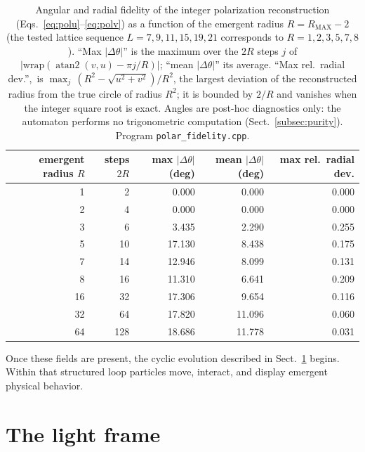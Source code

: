 \documentclass{ijuc}
\renewcommand{\arraystretch}{1.5}
\begin{document}
\begin{table}[htbp]
\centering
\caption{Angular and radial fidelity of the integer polarization reconstruction (Eqs.~\eqref{eq:polu}--\eqref{eq:polv}) as a function of the emergent radius $R=R_{\mathrm{MAX}}-2$ (the tested lattice sequence $L=7,9,11,15,19,21$ corresponds to $R=1,2,3,5,7,8$).  ``Max $|\Delta\theta|$'' is the maximum over the $2R$ steps $j$ of $\lvert\mathrm{wrap}(\operatorname{atan2}(v,u)-\pi j/R)\rvert$; ``mean $|\Delta\theta|$'' its average.  ``Max rel.\ radial dev.'',\ is $\max_{j}\,(R^{2}-\sqrt{u^{2}+v^{2}})/R^{2}$, the largest deviation of the reconstructed radius from the true circle of radius $R^{2}$; it is bounded by $2/R$ and vanishes when the integer square root is exact.  Angles are post-hoc diagnostics only: the automaton performs no trigonometric computation (Sect.~\ref{subsec:purity}).  Program \texttt{polar\_fidelity.cpp}.}
\label{tab:polar-fidelity}
\renewcommand{\arraystretch}{1.2}
\begin{tabular}{|r|r|r|r|r|}
\hline
emergent radius $R$ & steps $2R$ & max $|\Delta\theta|$ (deg) & mean $|\Delta\theta|$ (deg) & max rel.\ radial dev.\\
\hline
1 & 2 & 0.000 & 0.000 & 0.000\\
2 & 4 & 0.000 & 0.000 & 0.000\\
3 & 6 & 3.435 & 2.290 & 0.255\\
5 & 10 & 17.130 & 8.438 & 0.175\\
7 & 14 & 12.946 & 8.099 & 0.131\\
8 & 16 & 11.310 & 6.641 & 0.209\\
16 & 32 & 17.306 & 9.654 & 0.116\\
32 & 64 & 17.820 & 11.096 & 0.060\\
64 & 128 & 18.686 & 11.778 & 0.031\\
\hline
\end{tabular}
\end{table}

Once these fields are present, the cyclic evolution described in Sect.~\ref{sec:light-frame} begins.  Within that structured loop particles move, interact, and display emergent physical behavior.

\section{The light frame}\label{sec:light-frame}
\end{document}
